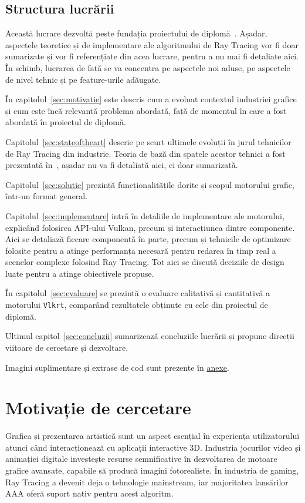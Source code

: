 \documentclass[12pt,a4paper]{report}
\numberwithin{equation}{section} %
\begin{document}
\section{Structura lucrării}

Această lucrare dezvoltă peste fundația proiectului de diplomă~\cite{DieXaR2024}.
Așadar, aspectele teoretice și de implementare ale algoritmului de Ray Tracing vor fi doar sumarizate și vor fi referențiate din acea lucrare, pentru a nu mai fi detaliate aici.
În schimb, lucrarea de față se va concentra pe aspectele noi aduse, pe aspectele de nivel tehnic și pe feature-urile adăugate. 

În capitolul~\ref{sec:motivatie} este descris cum a evoluat contextul industriei grafice și cum este încă relevantă problema abordată, față de momentul în care a fost abordată în proiectul de diplomă.

Capitolul~\ref{sec:stateoftheart} descrie pe scurt ultimele evoluții în jurul tehnicilor de Ray Tracing din industrie.
Teoria de bază din spatele acestor tehnici a fost prezentată în~\cite{DieXaR2024}, așadar nu va fi detaliată aici, ci doar sumarizată.

Capitolul~\ref{sec:solutie} prezintă funcționalitățile dorite și scopul motorului grafic, într-un format general.

Capitolul~\ref{sec:implementare} intră în detaliile de implementare ale motorului, explicând folosirea API-ului Vulkan, precum și interacțiunea dintre componente.
Aici se detaliază fiecare componentă în parte, precum și tehnicile de optimizare folosite pentru a atinge performanța necesară pentru redarea în timp real a scenelor complexe folosind Ray Tracing.
Tot aici se discută deciziile de design luate pentru a atinge obiectivele propuse.

În capitolul~\ref{sec:evaluare} se prezintă o evaluare calitativă și cantitativă a motorului \texttt{Vlkrt}, comparând rezultatele obținute cu cele din proiectul de diplomă. 

Ultimul capitol~\ref{sec:concluzii} sumarizează concluziile lucrării și propune direcții viitoare de cercetare și dezvoltare.

Imagini suplimentare și extrase de cod sunt prezente în \hyperref[anexa]{anexe}.


\chapter{\label{sec:motivatie}Motivație de cercetare}

Grafica și prezentarea artistică sunt un aspect esențial în experiența utilizatorului atunci când interacționează cu aplicații interactive 3D.
Industria jocurilor video și animației digitale investește resurse semnificative în dezvoltarea de motoare grafice avansate, capabile să producă imagini fotorealiste.
În industria de gaming, Ray Tracing a devenit deja o tehnologie mainstream, iar majoritatea lansărilor AAA oferă suport nativ pentru acest algoritm.
\end{document}
